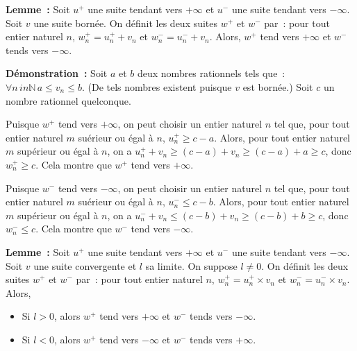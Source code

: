     \done

\medskip

\noindent\textbf{Lemme :} Soit $u^+$ une suite tendant vers $+\infty$ et $u^-$ une suite tendant vers $-\infty$.
    Soit $v$ une suite bornée.
    On définit les deux suites $w^+$ et $w^-$ par : pour tout entier naturel $n$, $w^+_n = u^+_n + v_n$ et $w^-_n = u^ -_n + v_n$.
    Alors, $w^+$ tend vers $+\infty$ et $w^-$ tends vers $-\infty$.

\medskip

\noindent\textbf{Démonstration :} 
    Soit $a$ et $b$ deux nombres rationnels tels que : $\forall n \, in \mathbb{N} \, a \leq v_n \leq b$. 
    (De tels nombres existent puisque $v$ est bornée.)
    Soit $c$ un nombre rationnel quelconque.

    Puisque $w^+$ tend vers $+\infty$, on peut choisir un entier naturel $n$ tel que, pour tout entier naturel $m$ suérieur ou égal à $n$, $u^+_n \geq c - a$.
    Alors, pour tout entier naturel $m$ supérieur ou égal à $n$, on a $u^+_n + v_n \geq (c - a) + v_n \geq (c - a) + a \geq c$, donc $w^+_n \geq c$.
    Cela montre que $w^+$ tend vers $+\infty$.
    
    Puisque $w^-$ tend vers $-\infty$, on peut choisir un entier naturel $n$ tel que, pour tout entier naturel $m$ suérieur ou égal à $n$, $u^-_n \leq c - b$.
    Alors, pour tout entier naturel $m$ supérieur ou égal à $n$, on a $u^-_n + v_n \leq (c - b) + v_n \geq (c - b) + b \geq c$, donc $w^-_n \leq c$.
    Cela montre que $w^-$ tend vers $-\infty$.

    \done

\medskip

\noindent\textbf{Lemme :} Soit $u^+$ une suite tendant vers $+\infty$ et $u^-$ une suite tendant vers $-\infty$.
    Soit $v$ une suite convergente et $l$ sa limite.
    On suppose $l \neq 0$.
    On définit les deux suites $w^+$ et $w^-$ par : pour tout entier naturel $n$, $w^+_n = u^+_n \times v_n$ et $w^-_n = u^ -_n \times v_n$.
    Alors, 
    \begin{itemize}[nosep]
        \item Si $l > 0$, alors $w^+$ tend vers $+\infty$ et $w^-$ tends vers $-\infty$.
        \item Si $l < 0$, alors $w^+$ tend vers $-\infty$ et $w^-$ tends vers $+\infty$.
    \end{itemize}

\medskip

